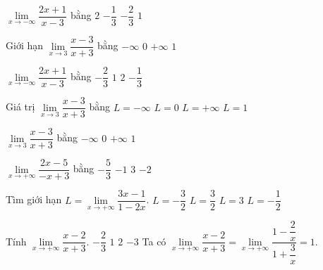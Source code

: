 \begin{ex}%
	$\lim\limits_{x \to - \infty} \dfrac{2x+1}{x-3}$ bằng
	\choice
	{\True $2$}
	{$- \dfrac{1}{3}$}
	{$- \dfrac{2}{3}$}
	{$1$}
\end{ex}%
\begin{ex}%
Giới hạn $\displaystyle\lim\limits_{x\to 3}\dfrac{x-3}{x+3}$ bằng
\choice
{$-\infty$}
{\True $0$}
{$+\infty$}
{$1$}
\end{ex}%
\begin{ex}%
	$\lim \limits_{x \to -\infty} \dfrac{2x+1}{x-3}$ bằng
	\choice
	{$-\dfrac{2}{3}$}
	{$1$}
	{\True $2$}
	{$-\dfrac{1}{3}$}
\end{ex}%
\begin{ex}%
	Giá trị $\underset{x\to 3}{\lim}\dfrac{x-3}{x+3}$ bằng
	\choice
	{$L=-\infty$}
	{\True $L=0$}
	{$L=+\infty$}
	{$L=1$}
\end{ex}%
\begin{ex}%
	$\lim\limits_{x \to 3} \dfrac{x - 3}{x + 3}$ bằng 
	\choice
	{$-\infty$}
	{\True $0$}
	{$+\infty$}
	{$1$}
\end{ex}%
\begin{ex}%
	$\lim\limits_{x\to +\infty}\dfrac{2x-5}{-x+3}$ bằng
	\choice
	{$-\dfrac{5}{3}$}
	{$-1$}
	{$3$}
	{\True $-2$}
\end{ex}%
\begin{ex}%
	Tìm giới hạn $L=\lim\limits_{x \to +\infty} \dfrac{3x-1}{1-2x}$.
	\choice
	{\True $L=-\dfrac{3}{2}$}
	{$L=\dfrac{3}{2}$}
	{$L=3$}
	{$L=-\dfrac{1}{2}$}
\end{ex}%
\begin{ex}%
	Tính $\lim\limits_{x\to+\infty}\dfrac{x-2}{x+3}$.
	\choice
	{$-\dfrac{2}{3}$}
	{\True $1$}
	{$2$}
	{$-3$}
	\loigiai
	{
		Ta có $\lim\limits_{x\to+\infty}\dfrac{x-2}{x+3}=\lim\limits_{x\to+\infty}\dfrac{1-\dfrac{2}{x}}{1+\dfrac{3}{x}}=1$.
	}
\end{ex}